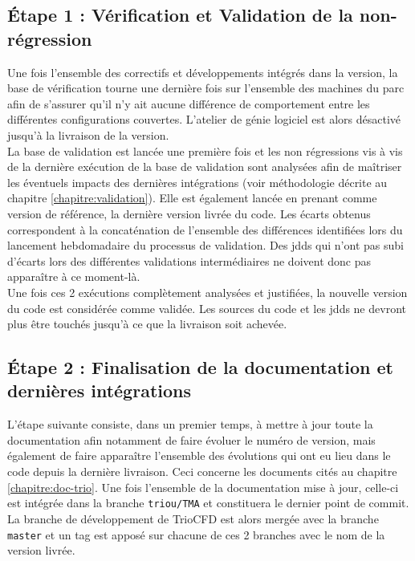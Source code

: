 \subsection{Étape 1 : Vérification et Validation de la non-r\'egression}
Une fois l'ensemble des correctifs et développements intégrés dans la version, la base de vérification tourne une dernière fois sur l'ensemble des machines du parc afin de s'assurer qu'il n'y ait aucune différence de comportement entre les différentes configurations couvertes. L'atelier de génie logiciel est alors désactivé jusqu'à la livraison de la version.\\
La base de validation est lancée une première fois et les non régressions vis à vis de la dernière exécution de la base de validation sont analysées afin de maîtriser les éventuels impacts des dernières intégrations (voir méthodologie décrite au chapitre \ref{chapitre:validation}). Elle est également lancée en prenant comme version de référence, la dernière version livrée du code. Les écarts obtenus correspondent à la concaténation de l'ensemble des différences identifiées lors du lancement hebdomadaire du processus de validation. Des jdds qui n'ont pas subi d'écarts lors des différentes validations intermédiaires ne doivent donc pas apparaître à ce moment-là.\\
Une fois ces 2 exécutions complètement analysées et justifiées, la nouvelle version du code est considérée comme validée. Les sources du code et les jdds ne devront plus être touchés jusqu'à ce que la livraison soit achevée.
\subsection{Étape 2 : Finalisation de la documentation et dernières intégrations}
L'étape suivante consiste, dans un premier temps, à mettre à jour toute la documentation afin notamment de faire évoluer le numéro de version, mais également de faire apparaître l'ensemble des évolutions qui ont eu lieu dans le code depuis la dernière livraison. Ceci concerne les documents cités au chapitre \ref{chapitre:doc-trio}. Une fois l'ensemble de la documentation mise à jour, celle-ci est intégrée dans la branche \texttt{triou/TMA} et constituera le dernier point de commit. La branche de développement de TrioCFD est alors mergée avec la branche \texttt{master} et un tag est apposé sur chacune de ces 2 branches avec le nom de la version livrée.
